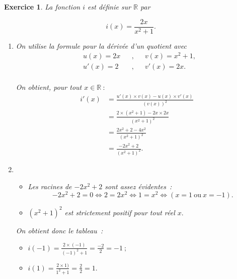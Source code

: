 \documentclass[10pt]{article}
\newtheorem{exo}{Exercice}
\begin{document}
\begin{exo}

La fonction $i$ est définie sur $\mathbb{R}$ par 

\[i(x)=\frac{2x}{x^2+1}.\]
 
\begin{enumerate}
\item On utilise la formule pour la dérivée d'un quotient avec
\begin{align*}
&u(x)=2x&&,&& v(x)=x^2+1, \\
& u'(x)=2&&, &&v'(x)=2x.\\
\end{align*}

On obtient, pour tout $x\in \mathbb{R}~:$
\begin{align*}i'(x)&=\frac{u'(x)\times v(x)-u(x)\times v'(x)}{(v(x))^2}
\\&=\frac{2\times\left(x^2+1\right)-2x\times 2x }{\left(x^2+1\right)^2}
\\&=\frac{2x^2+2-4x^2}{\left(x^2+1\right)^2}
\\&=\frac{-2x^2+2}{\left(x^2+1\right)^2}
.
\end{align*}


\item \begin{itemize}
\item[\textbullet] Les racines de $-2x^2+2$ sont assez évidentes~: 
\[-2x^2+2=0\iff 2=2x^2\iff 1=x^2\iff \left(x=1~\text{ou}~x=-1\right).\] 
\item[\textbullet] $\left(x^2+1\right)^2$ est strictement positif pour tout réel $x.$
\end{itemize}

On obtient donc le tableau~:

\medskip

\setlength{\columnseprule}{1pt}

\begin{multicols}{2}
\begin{center}
\end{center}

\columnbreak




\begin{itemize}
\item[\textbullet] $i(-1)=\frac{2\times(-1)}{(-1)^2+1}=\frac{-2}{2}=-1~;$
\item[\textbullet] $i(1)=\frac{2\times 1)}{1^2+1}=\frac{2}{2}=1.$
\end{itemize}


\end{multicols}
\end{enumerate}
\end{exo}
\end{document}
